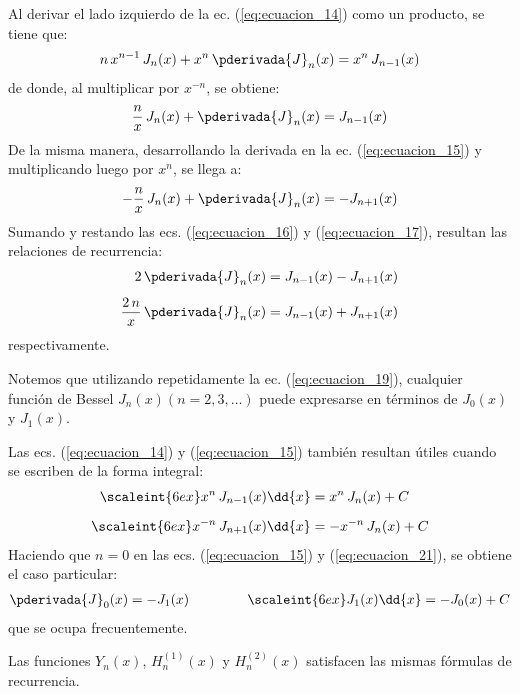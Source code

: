Al derivar el lado izquierdo de la ec. (\ref{eq:ecuacion_14}) como un producto, se tiene que:
\begin{align*}
n \, x^{n-1} \, J_{n}(x) + x^{n} \, \pderivada{J}_{n}(x) = x^{n} \, J_{n-1}(x)
\end{align*}
de donde, al multiplicar por $x^{-n}$, se obtiene:
\begin{align}
\dfrac{n}{x} \, J_{n}(x) + \pderivada{J}_{n}(x) = J_{n-1}(x)
\label{eq:ecuacion_16}
\end{align}
De la misma manera, desarrollando la derivada en la ec. (\ref{eq:ecuacion_15}) y multiplicando luego por $x^{n}$, se llega a:
\begin{align}
-\dfrac{n}{x} \, J_{n}(x) + \pderivada{J}_{n}(x) = - J_{n+1}(x)
\label{eq:ecuacion_17}    
\end{align}
Sumando y restando las ecs. (\ref{eq:ecuacion_16}) y (\ref{eq:ecuacion_17}), resultan las relaciones de recurrencia:
\begin{align}
2 \, \pderivada{J}_{n}(x) &= J_{n-1} (x) - J_{n+1}(x) \label{eq:ecuacion_18} \\[0.5em]
\dfrac{2 \, n}{x} \, \pderivada{J}_{n}(x) &= J_{n-1} (x) + J_{n+1}(x) \label{eq:ecuacion_19}
\end{align}
respectivamente.
\par
Notemos que utilizando repetidamente la ec. (\ref{eq:ecuacion_19}), cualquier función de Bessel $J_{n}(x) (n = 2, 3, \ldots)$ puede expresarse en términos de $J_{0}(x)$ y $J_{1}(x)$.
\par
Las ecs. (\ref{eq:ecuacion_14}) y (\ref{eq:ecuacion_15}) también resultan útiles cuando se escriben de la forma integral:
\begin{align}
\scaleint{6ex} x^{n} \, J_{n-1} (x) \dd{x} &= x^{n} \, J_{n}(x) + C \label{eq:ecuacion_20} \\[0.5em]
\scaleint{6ex} x^{-n} \, J_{n+1} (x) \dd{x} &= - x^{-n} \, J_{n}(x) + C \label{eq:ecuacion_21}
\end{align}
Haciendo que $n = 0$ en las ecs. (\ref{eq:ecuacion_15}) y (\ref{eq:ecuacion_21}), se obtiene el caso particular:
\begin{align*}
\pderivada{J}_{0} (x) = - J_{1}(x) \hspace{1.5cm} \scaleint{6ex} J_{1}(x) \dd{x} = - J_{0}(x) + C
\end{align*}
que se ocupa frecuentemente.
\par
Las funciones $Y_{n}(x)$, $H_{n}^{(1)} (x)$ y $H_{n}^{(2)} (x)$ satisfacen las mismas fórmulas de recurrencia.

